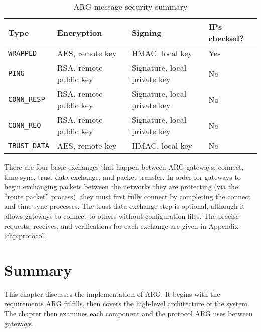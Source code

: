 \begin{table}
\caption{\ac{ARG} message security summary}
\label{tbl:arg_protocol_security}
\centering
\begin{tabular}{l|l|l|l}
\textbf{Type} & \textbf{Encryption} & \textbf{Signing} & \textbf{\acp{IP} checked?}\\
\hline
\texttt{WRAPPED} & AES, remote key & HMAC, local key & Yes\\
\texttt{PING} & RSA, remote public key & Signature, local private key & No\\
\texttt{CONN\_RESP} & RSA, remote public key & Signature, local private key & No\\
\texttt{CONN\_REQ} & RSA, remote public key & Signature, local private key & No\\
\texttt{TRUST\_DATA} & AES, remote key & HMAC, local key & No\\
\end{tabular}
\end{table}

\par There are four basic exchanges that happen between \ac{ARG} gateways: connect, time sync, trust data exchange, and packet transfer. In order for gateways to begin exchanging packets between the networks they are protecting (via the ``route packet'' process), they must first fully connect by completing the connect and time sync processes. The trust data exchange step is optional, although it allows gateways to connect to others without configuration files. The precise requests, receives, and verifications for each exchange are given in Appendix \ref{chp:protocol}.

\section{Summary}
\par This chapter discusses the implementation of \ac{ARG}. It begins with the requirements \ac{ARG} fulfills, then covers the high-level architecture of the system. The chapter then examines each component and the protocol \ac{ARG} uses between gateways.

